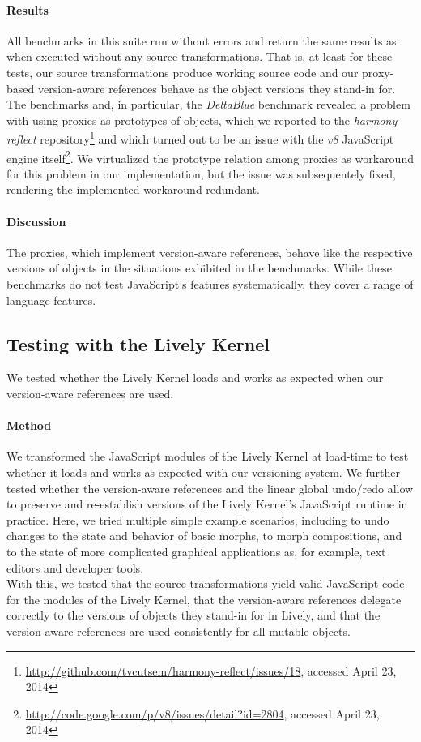 \paragraph{Results}
All benchmarks in this suite run without errors and return the same results as when executed without any source transformations.
That is, at least for these tests, our source transformations produce working source code and our proxy-based version-aware references behave as the object versions they stand-in for.
The benchmarks and, in particular, the \emph{DeltaBlue} benchmark revealed a problem with using proxies as prototypes of objects, which we reported to the \emph{harmony-reflect} repository\footnote{\url{http://github.com/tvcutsem/harmony-reflect/issues/18}, accessed April 23, 2014} and which turned out to be an issue with the \emph{v8} JavaScript engine itself\footnote{\url{http://code.google.com/p/v8/issues/detail?id=2804}, accessed April 23, 2014}.
We virtualized the prototype relation among proxies as workaround for this problem in our implementation, but the issue was subsequentely fixed, rendering the implemented workaround redundant.

\paragraph{Discussion}
The proxies, which implement version-aware references, behave like the respective versions of objects in the situations exhibited in the benchmarks.
While these benchmarks do not test JavaScript's features systematically, they cover a range of language features.


\subsection{Testing with the Lively Kernel}

We tested whether the Lively Kernel loads and works as expected when our version-aware references are used.

\paragraph{Method}
We transformed the JavaScript modules of the Lively Kernel at load-time to test whether it loads and works as expected with our versioning system.
We further tested whether the version-aware references and the linear global undo/redo allow to preserve and re-establish versions of the Lively Kernel's JavaScript runtime in practice.
Here, we tried multiple simple example scenarios, including to undo changes to the state and behavior of basic morphs, to morph compositions, and to the state of more complicated graphical applications as, for example, text editors and developer tools.\\
With this, we tested that the source transformations yield valid JavaScript code for the modules of the Lively Kernel, that the version-aware references delegate correctly to the versions of objects they stand-in for in Lively, and that the version-aware references are used consistently for all mutable objects.


